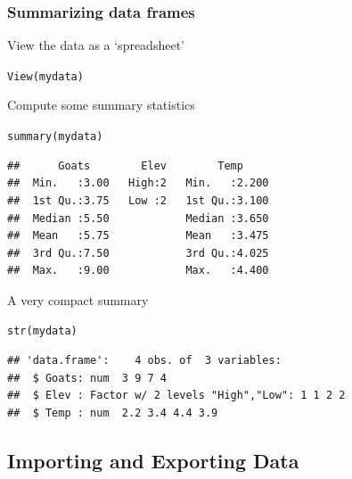\documentclass[color=usenames,dvipsnames]{beamer}\usepackage[]{graphicx}\usepackage[]{color}
\makeatletter
\newcommand{\hlstd}[1]{\textcolor[rgb]{0,0,0}{#1}}%
\newcommand{\hlkwd}[1]{\textcolor[rgb]{0.004,0.004,0.506}{#1}}%
\newenvironment{kframe}{%
 \def\at@end@of@kframe{}%
 \ifinner\ifhmode%
  \def\at@end@of@kframe{\end{minipage}}%
  \begin{minipage}{\columnwidth}%
 \fi\fi%
 \def\FrameCommand##1{\hskip\@totalleftmargin \hskip-\fboxsep
 \colorbox{shadecolor}{##1}\hskip-\fboxsep
     \hskip-\linewidth \hskip-\@totalleftmargin \hskip\columnwidth}%
 \MakeFramed {\advance\hsize-\width
   \@totalleftmargin\z@ \linewidth\hsize
   \@setminipage}}%
 {\par\unskip\endMakeFramed%
 \at@end@of@kframe}
\newenvironment{knitrout}{}{} %
\makeatother
\begin{document}
\begin{frame}[fragile]
  \frametitle{Summarizing data frames}
  \small
  View the data as a `spreadsheet'
\begin{knitrout}\footnotesize
{}\color{fgcolor}\begin{kframe}
\begin{alltt}
\hlkwd{View}\hlstd{(mydata)}
\end{alltt}
\end{kframe}
\end{knitrout}
\pause \vfill
Compute some summary statistics
\begin{knitrout}\scriptsize
{}\color{fgcolor}\begin{kframe}
\begin{alltt}
\hlkwd{summary}\hlstd{(mydata)}
\end{alltt}
\begin{verbatim}
##      Goats        Elev        Temp      
##  Min.   :3.00   High:2   Min.   :2.200  
##  1st Qu.:3.75   Low :2   1st Qu.:3.100  
##  Median :5.50            Median :3.650  
##  Mean   :5.75            Mean   :3.475  
##  3rd Qu.:7.50            3rd Qu.:4.025  
##  Max.   :9.00            Max.   :4.400
\end{verbatim}
\end{kframe}
\end{knitrout}
\pause \vfill
A very compact summary
\begin{knitrout}\scriptsize
{}\color{fgcolor}\begin{kframe}
\begin{alltt}
\hlkwd{str}\hlstd{(mydata)}
\end{alltt}
\begin{verbatim}
## 'data.frame':	4 obs. of  3 variables:
##  $ Goats: num  3 9 7 4
##  $ Elev : Factor w/ 2 levels "High","Low": 1 1 2 2
##  $ Temp : num  2.2 3.4 4.4 3.9
\end{verbatim}
\end{kframe}
\end{knitrout}
\end{frame}



\subsection{Importing and Exporting Data}
\end{document}
